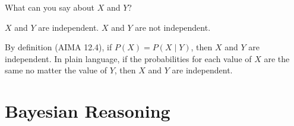 \begin{questions}
What can you say about $X$ and $Y$?

\begin{choices}
\correctchoice $X$ and $Y$ are independent.
\choice $X$ and $Y$ are not independent.
\end{choices}

\begin{solution}[.5in]
By definition (AIMA 12.4), if $P(X) = P(X \mid Y)$, then $X$ and $Y$ are independent.  In plain language, if the probabilities for each value of $X$ are the same no matter the value of $Y$, then $X$ and $Y$ are independent.
\end{solution}

\end{questions}

\newpage

\section{Bayesian Reasoning}

